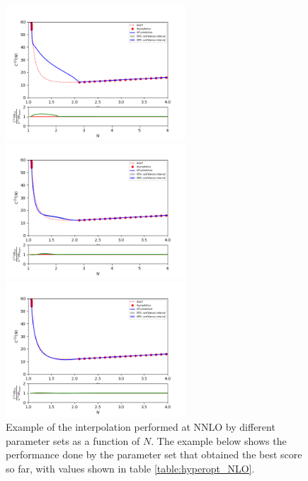 \documentclass[12pt]{article}
\begin{document}
\begin{figure}
	\centering
	
	\includegraphics[width=0.6\textwidth]{plots/nlo_test_rquad.png}
	
	\includegraphics[width=0.6\textwidth]{plots/nlo_test_matern.png}
	
	\includegraphics[width=0.6\textwidth]{plots/nlo_matern2.png}
	
	\caption{Example of the interpolation performed at NNLO by different parameter sets as a function of $N$. The example below shows the performance done by the parameter set that obtained the best score so far, with values shown in table \ref{table:hyperopt_NLO}.}
	\label{nlo_examples}

\end{figure}
\end{document}

